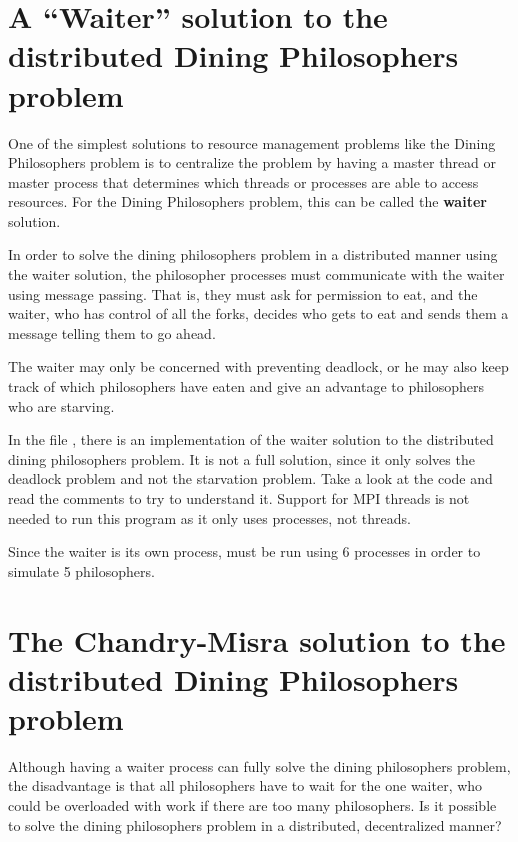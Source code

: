 \documentclass[letterpaper,10pt,openany,oneside]{sphinxmanual}
\begin{document}
\section{A ``Waiter'' solution to the distributed Dining Philosophers problem}
\label{Distributed/Distributed:a-waiter-solution-to-the-distributed-dining-philosophers-problem}
One of the simplest solutions to resource management problems like
the Dining Philosophers problem is to centralize the problem by
having a master thread or master process that determines which
threads or processes are able to access resources. For the Dining
Philosophers problem, this can be called the \textbf{waiter} solution.

In order to solve the dining philosophers problem in a distributed
manner using the waiter solution, the philosopher processes must
communicate with the waiter using message passing. That is, they
must ask for permission to eat, and the waiter, who has control of
all the forks, decides who gets to eat and sends them a message
telling them to go ahead.

The waiter may only be concerned with preventing deadlock, or he
may also keep track of which philosophers have eaten and give an
advantage to philosophers who are starving.

In the file , there is an implementation
of the waiter solution to the distributed dining philosophers
problem. It is not a full solution, since it only solves the
deadlock problem and not the starvation problem. Take a look at the
code and read the comments to try to understand it. Support for MPI
threads is not needed to run this program as it only uses
processes, not threads.

Since the waiter is its own process,  must be
run using 6 processes in order to simulate 5 philosophers.


\section{The Chandry-Misra solution to the distributed Dining Philosophers problem}
\label{Distributed/Distributed:the-chandry-misra-solution-to-the-distributed-dining-philosophers-problem}
Although having a waiter process can fully solve the dining
philosophers problem, the disadvantage is that all philosophers
have to wait for the one waiter, who could be overloaded with work
if there are too many philosophers. Is it possible to solve the
dining philosophers problem in a distributed, decentralized
manner?
\end{document}

